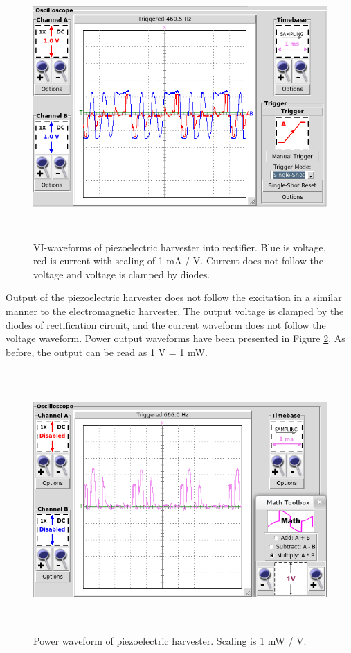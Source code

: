 \begin{figure}[htb]
\begin{center}
\includegraphics[height=10cm]{images/own_measurement/generator_shaker/piezo_td_vi_330hz_2_3.png}
\end{center}
\caption{\label{fig:piezo_td_vi} VI-waveforms of piezoelectric harvester into rectifier. Blue is voltage, red is current with scaling of 1 mA / V. Current does not follow the voltage and voltage is clamped by diodes.}
\end{figure}

Output of the piezoelectric harvester does not follow the excitation in a similar manner to the electromagnetic harvester. The output voltage is clamped by the diodes of rectification circuit, and the current waveform does not follow the voltage waveform. Power output waveforms have been presented in Figure \ref{fig:piezo_td_power}. As before, the output can be read as 1 V = 1 mW. 

\begin{figure}[htb]
\begin{center}
\includegraphics[height=10cm]{images/own_measurement/generator_shaker/piezo_td_power_330hz_2_3.png}
\end{center}
\caption{\label{fig:piezo_td_power} Power waveform of piezoelectric harvester. Scaling is 1 mW / V.}
\end{figure}

